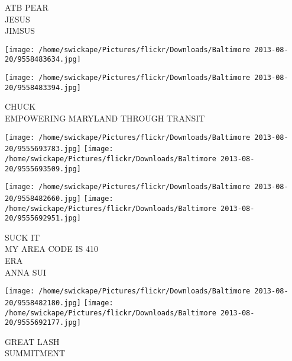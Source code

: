 \documentclass[10pt,letterpaper]{article}
\begin{document}
ATB PEAR\\
JESUS\\
JIMSUS
\pagebreak

\texttt{[image: /home/swickape/Pictures/flickr/Downloads/Baltimore 2013-08-20/9558483634.jpg]}

\vspace{0.25in}
\texttt{[image: /home/swickape/Pictures/flickr/Downloads/Baltimore 2013-08-20/9558483394.jpg]}

CHUCK\\
EMPOWERING MARYLAND THROUGH TRANSIT
\pagebreak

\texttt{[image: /home/swickape/Pictures/flickr/Downloads/Baltimore 2013-08-20/9555693783.jpg]}
\texttt{[image: /home/swickape/Pictures/flickr/Downloads/Baltimore 2013-08-20/9555693509.jpg]}

\texttt{[image: /home/swickape/Pictures/flickr/Downloads/Baltimore 2013-08-20/9558482660.jpg]}
\texttt{[image: /home/swickape/Pictures/flickr/Downloads/Baltimore 2013-08-20/9555692951.jpg]}

SUCK IT\\
MY AREA CODE IS 410\\
ERA\\
ANNA SUI
\pagebreak

\texttt{[image: /home/swickape/Pictures/flickr/Downloads/Baltimore 2013-08-20/9558482180.jpg]}
\texttt{[image: /home/swickape/Pictures/flickr/Downloads/Baltimore 2013-08-20/9555692177.jpg]}

GREAT LASH\\
SUMMITMENT
\pagebreak
\end{document}
